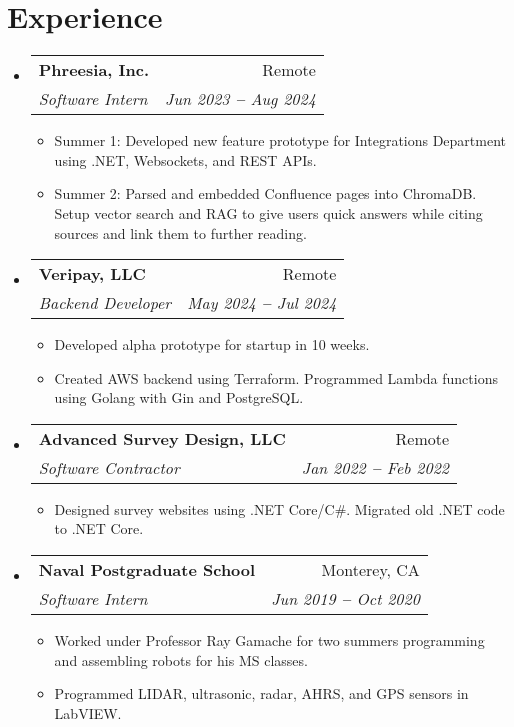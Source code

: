 \documentclass[12pt]{article}
\makeatletter
\newcommand{\entry}[1]{
  \item\small{
    {#1 \vspace{-2pt}}
  }
}
\newcommand{\subheading}[4]{
  \vspace{-2pt}\item
    \begin{tabular*}{0.97\textwidth}[t]{l@{\extracolsep{\fill}}r}
      \textbf{#1} & #2 \\
      \textit{\small#3} & \textit{\small #4} \\
    \end{tabular*}\vspace{-7pt}
}
\newcommand{\subheadingliststart}{\begin{itemize}[leftmargin=0.15in, label={}]}
\newcommand{\subheadinglistend}{\end{itemize}}
\newcommand{\entryliststart}{\begin{itemize}}
\newcommand{\entrylistend}{\end{itemize}\vspace{-5pt}}
\makeatother
\begin{document}
\section{Experience}
  \vspace{3pt}
  \subheadingliststart
    \subheading
      {Phreesia, Inc.}{Remote}
      {Software Intern}{Jun 2023 \textbf{--} Aug 2024}
        \entryliststart
            \entry{Summer 1: Developed new feature prototype for Integrations Department using .NET, Websockets, and REST APIs.}
            \entry{Summer 2: Parsed and embedded Confluence pages into ChromaDB. Setup vector search and RAG to give users quick answers while citing sources and link them to further reading.}
        \entrylistend
    \subheading
      {Veripay, LLC}{Remote}
      {Backend Developer}{May 2024 \textbf{--} Jul 2024}
        \entryliststart
            \entry{Developed alpha prototype for startup in 10 weeks.}
            \entry{Created AWS backend using Terraform. Programmed Lambda functions using Golang with Gin and PostgreSQL.}
        \entrylistend
    \subheading
      {Advanced Survey Design, LLC}{Remote}
      {Software Contractor}{Jan 2022 \textbf{--} Feb 2022}
        \entryliststart
            \entry{Designed survey websites using .NET Core/C\#. Migrated old .NET code to .NET Core.}
        \entrylistend
    \subheading
      {Naval Postgraduate School}{Monterey, CA}
      {Software Intern}{Jun 2019 \textbf{--} Oct 2020}
        \entryliststart
            \entry{Worked under Professor Ray Gamache for two summers programming and assembling robots for his MS classes.}
            \entry{Programmed LIDAR, ultrasonic, radar, AHRS, and GPS sensors in LabVIEW.}
        \entrylistend
  \subheadinglistend
\end{document}
